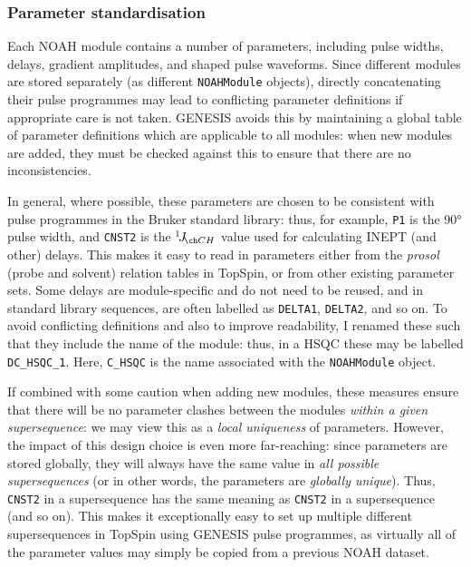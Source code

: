 \subsubsection{Parameter standardisation}

Each NOAH module contains a number of parameters, including pulse widths, delays, gradient amplitudes, and shaped pulse waveforms.
Since different modules are stored separately (as different \texttt{NOAHModule} objects), directly concatenating their pulse programmes may lead to conflicting parameter definitions if appropriate care is not taken.
GENESIS avoids this by maintaining a global table of parameter definitions which are applicable to all modules: when new modules are added, they must be checked against this to ensure that there are no inconsistencies.

In general, where possible, these parameters are chosen to be consistent with pulse programmes in the Bruker standard library: thus, for example, \texttt{P1} is the \proton{} \ang{90} pulse width, and \texttt{CNST2} is the $\oneJ{CH}$ value used for calculating INEPT (and other) delays.
This makes it easy to read in parameters either from the \textit{prosol} (probe and solvent) relation tables in TopSpin, or from other existing parameter sets.
Some delays are module-specific and do not need to be reused, and in standard library sequences, are often labelled as \texttt{DELTA1}, \texttt{DELTA2}, and so on.
To avoid conflicting definitions and also to improve readability, I renamed these such that they include the name of the module: thus, in a \carbon{} HSQC these may be labelled \texttt{DC\_HSQC\_1}.
Here, \texttt{C\_HSQC} is the name associated with the \texttt{NOAHModule} object.

If combined with some caution when adding new modules, these measures ensure that there will be no parameter clashes between the modules \textit{within a given supersequence}: we may view this as a \textit{local uniqueness} of parameters.
However, the impact of this design choice is even more far-reaching:
since parameters are stored globally, they will always have the same value in \textit{all possible supersequences} (or in other words, the parameters are \textit{globally unique}).
Thus, \texttt{CNST2} in a  supersequence has the same meaning as \texttt{CNST2} in a  supersequence (and so on).
This makes it exceptionally easy to set up multiple different supersequences in TopSpin using GENESIS pulse programmes, as virtually all of the parameter values may simply be copied from a previous NOAH dataset.

